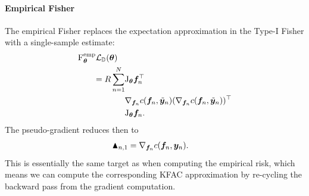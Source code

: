 \paragraph{Empirical Fisher}
The empirical Fisher replaces the expectation approximation in the Type-I Fisher with a single-sample estimate:
\begin{align*}
  \mathrm{F}_{\bm{\theta}}^{\text{emp}} &{\mathcal{L}}_{{\mathbb{D}}}({\bm{\theta}}) \\
  &\begin{aligned}= R \sum_{n=1}^N
      &\mathrm{J}_{{\bm{\theta}}} {\bm{f}}_n^{\top} \\
      & \nabla_{{\bm{f}}_n} c({\bm{f}}_n, \tilde{{\bm{y}}}_{n}) (\nabla_{{\bm{f}}_n} c({\bm{f}}_n, \tilde{{\bm{y}}}_n ))^{\top} \\
      &\mathrm{J}_{{\bm{\theta}}} {\bm{f}}_n.
  \end{aligned}
\end{align*}
The pseudo-gradient reduces then to
\begin{align*}
  \blacktriangle_{n,1}
  &= \nabla_{{\bm{f}}_n}  c({\bm{f}}_n, {\bm{y}}_n).
\end{align*}
This is essentially the same target as when computing the empirical risk, which means we can compute the corresponding KFAC approximation by re-cycling the backward pass from the gradient computation.


